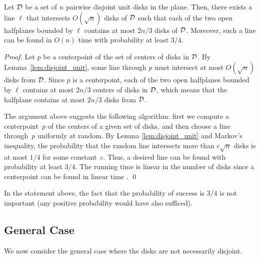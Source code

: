 \documentclass{llncs}
\begin{document}
\begin{corollary}
\label{cor:disjoint_unit}
Let $\cal{D}$ be a set of $n$ pairwise disjoint unit disks in the plane. 
Then, there exists a line $\ell$ that intersects $O(\sqrt{n})$ disks of $\cal{D}$ such that each of the two open halfplanes bounded by $\ell$ contains 
at most $2n/3$ disks of $\cal{D}$.
Moreover, such a line can be found in $O(n)$ time with probability
at least $3/4$.
\end{corollary}
\begin{proof}
Let $p$ be a centerpoint of the set of centers of disks in ${\cal D}$.
By Lemma~\ref{lem:disjoint_unit}, some line through $p$ must intersect
at most $O(\sqrt{n})$ disks from ${\cal D}$.
Since $p$ is a centerpoint, each of the two open halfplanes bounded by
$\ell$ contains at most $2n/3$ centers of disks in ${\cal D}$,
which means that the halfplane contains at most $2n/3$ disks from ${\cal D}$.

The argument above suggests the following algorithm:
first we compute a centerpoint~$p$ of the centers of a given set of
disks, and then choose a line through~$p$ uniformly at random.
By Lemma \ref{lem:disjoint_unit} and Markov's inequality, 
the probability that the random line intersects more than $c\sqrt{n}$ disks
is at most $1/4$ for some constant~$c$.
Thus, a desired line can be found with probability at least $3/4$.
The running time is linear in the number of disks since
a centerpoint can be found in linear time \cite{DBLP:journals/dcg/JadhavM94}.
\qed
\end{proof}


In the statement above, the fact that the probability of success is $3/4$ is not important (any positive probability would have also sufficed). 


\subsection{General Case}
\label{subsec:generalcase}

We now consider the general case where the disks are not necessarily disjoint.
\end{document}
